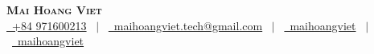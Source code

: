\documentclass[letterpaper,11pt]{article}
\begin{document}

\begin{center}
    \textbf{\Huge \scshape Mai Hoang Viet} \\ \vspace{3pt}
    \small
    \href{tel:+840971600213}{\raisebox{-0.05\height}\faMobile \ +84 971600213} \ $|$ \ 
    \href{mailto:maihoangviet.tech@gmail.com}{\raisebox{-0.05\height}\faEnvelope \ maihoangviet.tech@gmail.com} \ $|$ \ 
    \href{https://www.linkedin.com/in/maihoangviet}{\raisebox{-0.05\height}\faLinkedin\ maihoangviet} \ $|$ \ 
    \href{https://github.com/maihoangviet}{\raisebox{-0.05\height}\faGithub\ maihoangviet} \\
\end{center}

\end{document}
